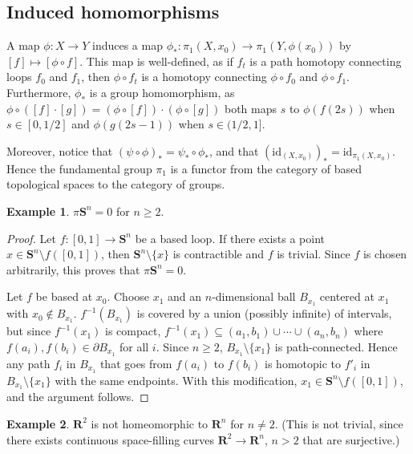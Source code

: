 \documentclass[11pt]{article}
\theoremstyle{definition}
\newtheorem*{example}{Example}
\theoremstyle{plain}
\theoremstyle{remark}
\newcommand{\id}{\textrm{id}}
\newcommand{\R}{\mathbf{R}}
\begin{document}
\subsection{Induced homomorphisms}\label{6}

A map $\phi:X\to Y$ induces a map $\phi_\ast:\pi_1(X,x_0)\to\pi_1(Y,\phi(x_0))$ by $[f]\mapsto[\phi\circ f]$. This map is well-defined, as if $f_t$ is a path homotopy connecting loops $f_0$ and $f_1$, then $\phi\circ f_t$ is a homotopy connecting $\phi\circ f_0$ and $\phi\circ f_1$. Furthermore, $\phi_\ast$ is a group homomorphism, as $\phi\circ([f]\cdot[g])=(\phi\circ[f])\cdot(\phi\circ[g])$ both maps $s$ to $\phi(f(2s))$ when $s\in[0,1/2]$ and $\phi(g(2s-1))$ when $s\in(1/2,1]$.\medbreak

Moreover, notice that $(\psi\circ\phi)_\ast=\psi_\ast\circ\phi_\ast$, and that $(\id_{(X,x_0)})_\ast=\id_{\pi_1(X,x_0)}$. Hence the fundamental group $\pi_1$ is a functor from the category of based topological spaces to the category of groups.

\begin{example}
$\pi\mathbf{S}^n=0$ for $n\geq2$.
\begin{proof}
Let $f:[0,1]\to\mathbf{S}^n$ be a based loop. If there exists a point $x\in\mathbf{S}^n\setminus f([0,1])$, then $\mathbf{S}^n\setminus\{x\}$ is contractible and $f$ is trivial. Since $f$ is chosen arbitrarily, this proves that $\pi\mathbf{S}^n=0$.\medbreak

Let $f$ be based at $x_0$. Choose $x_1$ and an $n$-dimensional ball $B_{x_1}$ centered at $x_1$ with $x_0\not\in B_{x_1}$. $f^{-1}(B_{x_1})$ is covered by a union (possibly infinite) of intervals, but since $f^{-1}(x_1)$ is compact, $f^{-1}(x_1)\subseteq(a_1,b_1)\cup\cdots\cup(a_n,b_n)$ where $f(a_i),f(b_i)\in\partial B_{x_1}$ for all $i$. Since $n\geq2$, $B_{x_1}\setminus\{x_1\}$ is path-connected. Hence any path $f_i$ in $B_{x_1}$ that goes from $f(a_i)$ to $f(b_i)$ is homotopic to $f'_i$ in $B_{x_1}\setminus\{x_1\}$ with the same endpoints. With this modification, $x_1\in\mathbf{S}^n\setminus f([0,1])$, and the argument follows.
\end{proof}
\end{example}


\begin{example}
$\R^2$ is not homeomorphic to $\R^n$ for $n\neq2$. (This is not trivial, since there exists continuous space-filling curves $\R^2\to\R^n$, $n>2$ that are surjective.)
\end{example}
\end{document}
